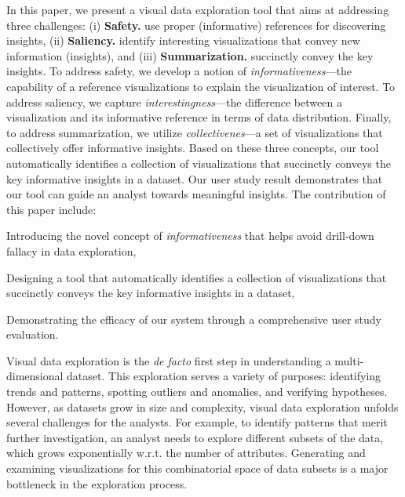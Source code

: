 In this paper, we present a visual data exploration tool that aims at addressing three challenges: (i) \textbf{Safety.} use proper (informative) references for discovering insights, (ii)  \textbf{Saliency.} identify interesting visualizations that convey new information (insights), and (iii) \textbf{Summarization.} succinctly convey the key insights. To address safety, we develop a notion of \emph{informativeness}---the capability of a reference visualizations to explain the visualization of interest. To address saliency, we capture \emph{interestingness}---the difference between a visualization and its informative reference in terms of data distribution. Finally, to address summarization, we utilize \emph{collectivenes}---a set of visualizations that collectively offer informative insights. Based on these three concepts, our tool automatically identifies a collection of visualizations that succinctly conveys the key informative insights in a dataset. Our user study result demonstrates that our tool can guide an analyst towards meaningful insights. The contribution of this paper include:
\begin{denselist}
\item Introducing the novel concept of \emph{informativeness} that helps avoid drill-down fallacy in data exploration,
\item Designing a tool that automatically identifies a collection of visualizations that succinctly conveys the key informative insights in a dataset,
\item Demonstrating the efficacy of our system through a comprehensive user study evaluation.
\end{denselist}

\iffalse

Visual data exploration is the \emph{de facto} first step in understanding a multi-dimensional dataset. This exploration serves a variety of purposes: identifying trends and patterns, spotting outliers and anomalies, and verifying hypotheses. However, as datasets grow in size and complexity, visual data exploration unfolds several challenges for the analysts. For example, to identify patterns that merit further investigation, an analyst needs to explore different subsets of the data, which grows exponentially w.r.t. the number of attributes. Generating and examining visualizations for this combinatorial space of data subsets is a major bottleneck in the exploration process.

